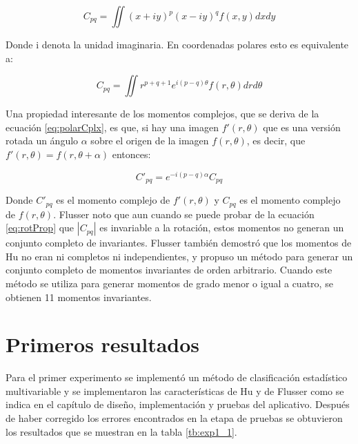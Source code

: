 \documentclass[a4paper, 11pt, oneside]{report}
\begin{document}
	\[ C_{pq} = \iint{ (x+iy)^p (x-iy)^q f(x,y) dx dy } \]
	
Donde i denota la unidad imaginaria. En coordenadas polares esto es equivalente a:

	\begin{equation}\label{eq:polarCplx}
		C_{pq} = \iint{ r^{p+q+1}e^{i(p-q)\theta}f(r,\theta) dr d\theta }
	\end{equation}

Una propiedad interesante de los momentos complejos, que se deriva de la ecuación \ref{eq:polarCplx}, es que, si hay una imagen $f'(r,\theta)$ que es una versión rotada un ángulo $\alpha$ sobre el origen de la imagen $f(r,\theta)$, es decir, que $f'(r,\theta) = f(r,\theta+\alpha)$ entonces:

\begin{equation}\label{eq:rotProp}
	C'_{pq} = e^{-i(p-q)\alpha}C_{pq}
\end{equation}

Donde $C'_{pq}$ es el momento complejo de $f'(r,\theta)$ y $C_{pq}$ es el momento complejo de $f(r,\theta)$. Flusser noto\cite{flusser99} que aun cuando se puede probar de la ecuación \ref{eq:rotProp} que $|C_{pq}|$ es invariable a la rotación, estos momentos no generan un conjunto completo de invariantes. Flusser también demostró que los momentos de Hu no eran ni completos ni independientes, y propuso un método para generar un conjunto completo de momentos invariantes de orden arbitrario. Cuando este método se utiliza para generar momentos de grado menor o igual a cuatro, se obtienen 11 momentos invariantes.

\section{Primeros resultados}
\label{sect:exp}

Para el primer experimento se implementó un método de clasificación estadístico multivariable y se implementaron las características de Hu y de Flusser como se indica en el capítulo de diseño, implementación y pruebas del aplicativo. Después de haber corregido los errores encontrados en la etapa de pruebas se obtuvieron los resultados que se muestran en la tabla \ref{tb:exp1_1}.
\end{document}
